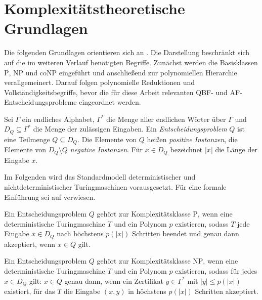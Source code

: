 \section{Komplexitätstheoretische Grundlagen}
\label{sec:complexity}
Die folgenden Grundlagen orientieren sich an
\textcite[Abschnitt~2.2]{dvorak:2012:computational-aspects}. Die Darstellung
beschränkt sich auf die im weiteren Verlauf benötigten Begriffe.
Zunächst werden die Basisklassen \(\mathrm{P}\), \(\mathrm{NP}\) und
\(\mathrm{coNP}\) eingeführt und anschließend zur polynomiellen Hierarchie
verallgemeinert. Darauf folgen polynomielle Reduktionen und
Vollständigkeitsbegriffe, bevor die für diese Arbeit relevanten QBF- und
AF-Entscheidungsprobleme eingeordnet werden.

\begin{Definition}[Entscheidungsproblem]
    \label{def:decision-problem}
    Sei \(\Gamma\) ein endliches Alphabet, \(\Gamma^*\) die Menge aller
    endlichen Wörter über \(\Gamma\) und \(D_Q\subseteq\Gamma^*\) die
    Menge der zulässigen Eingaben. Ein \emph{Entscheidungsproblem} \(Q\)
    ist eine Teilmenge \(Q\subseteq D_Q\). Die Elemente von \(Q\) heißen
    \emph{positive Instanzen}, die Elemente von \(D_Q\setminus Q\)
    \emph{negative Instanzen}. Für \(x\in D_Q\) bezeichnet \(|x|\) die
    Länge der Eingabe \(x\).
\end{Definition}
Im Folgenden wird das Standardmodell deterministischer und
nichtdeterministischer Turingmaschinen vorausgesetzt. 
Für eine formale Einführung sei auf
\textcite[Kap.~4]{hromkovic:2014:theoretische-informatik}
verwiesen.
\begin{Definition}[P]
    \label{def:p-np-conp}
    Ein Entscheidungsproblem \(Q\) gehört zur Komplexitätsklasse
    \(\mathrm{P}\), wenn eine deterministische Turingmaschine \(T\) und
    ein Polynom \(p\) existieren, sodass \(T\) jede Eingabe
    \(x\in D_Q\) nach höchstens \(p(|x|)\) Schritten beendet und genau
    dann akzeptiert, wenn \(x\in Q\) gilt.
\end{Definition}

\begin{Definition}[NP]
        Ein Entscheidungsproblem \(Q\) gehört zur Komplexitätsklasse
    \(\mathrm{NP}\), wenn eine deterministische Turingmaschine \(T\) und
    ein Polynom \(p\) existieren, sodass für jedes \(x\in D_Q\) gilt:
    \(x\in Q\) genau dann, wenn ein Zertifikat \(y\in\Gamma^*\) mit
    \(|y|\leq p(|x|)\) existiert, für das \(T\) die Eingabe \((x,y)\)
    in höchstens \(p(|x|)\) Schritten akzeptiert.
\end{Definition}

